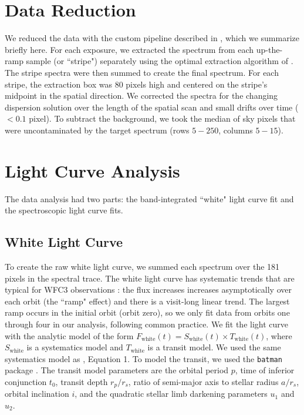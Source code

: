 \documentclass[twocolumn]{aastex61}
\begin{document}
\section{Data Reduction}
We reduced the data with the custom pipeline described in \cite{kreidberg14a}, which we summarize briefly here. For each exposure, we extracted the spectrum from each up-the-ramp sample (or ``stripe") separately using the optimal extraction algorithm of \cite{horne86}. The stripe spectra were then summed to create the final spectrum. For each stripe, the extraction box was 80 pixels high and centered on the stripe's midpoint in the spatial direction. We corrected the spectra for the changing dispersion solution over the length of the spatial scan and small drifts over time ($<0.1$ pixel).  To subtract the background, we took the median of sky pixels that were uncontaminated by the target spectrum (rows $5-250$, columns $5-15$). 

\section{Light Curve Analysis}
The data analysis had two parts: the band-integrated ``white" light curve fit and the spectroscopic light curve fits.

\subsection{White Light Curve}
To create the raw white light curve, we summed each spectrum over the 181 pixels in the spectral trace.  The white light curve has systematic trends that are typical for WFC3 observations \citep{zhou17}: the flux increases increases asymptotically over each orbit (the ``ramp" effect) and there is a visit-long linear trend. The largest ramp occurs in the initial orbit (orbit zero), so we only fit data from orbits one through four in our analysis, following common practice.  We fit the light curve with the analytic model of the form $F_\mathrm{white}(t) = S_\mathrm{white}(t)\times T_\mathrm{white}(t)$, where $S_\mathrm{white}$ is a systematics model and $T_\mathrm{white}$ is a transit model. We used the same systematics model as \cite{kreidberg15b}, Equation 1.  To model the transit, we used the \texttt{batman} package \citep{kreidberg15a}.  The transit model parameters are the orbital period $p$, time of inferior conjunction $t_0$, transit depth $r_p/r_s$, ratio of semi-major axis to stellar radius $a/r_s$, orbital inclination $i$, and the quadratic stellar limb darkening parameters $u_1$ and $u_2$.
\end{document}

